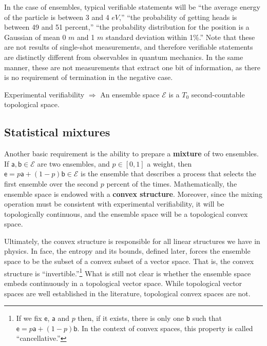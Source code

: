 \documentclass[10pt,twocolumn, nofootinbib]{revtex4-2}
\newcommand{\ens}[1][e] {\mathsf{#1}} %
\newcommand{\Ens}[1][E] {\mathcal{#1}} %
\begin{document}
In the case of ensembles, typical verifiable statements will be ``the average energy of the particle is between 3 and 4 $eV$,'' ``the probability of getting heads is between 49 and 51 percent,'' ``the probability distribution for the position is a Gaussian of mean 0 $m$ and 1 $m$ standard deviation within 1\%.'' Note that these are not results of single-shot measurements, and therefore verifiable statements are distinctly different from observables in quantum mechanics. In the same manner, these are not measurements that extract one bit of information, as there is no requirement of termination in the negative case.

\begin{tcolorbox}[colback=white, colframe=black]
	Experimental verifiability $\Rightarrow$ An ensemble space $\Ens$ is a $T_0$ second-countable topological space.
\end{tcolorbox}


\subsection{Statistical mixtures}
Another basic requirement is the ability to prepare a \textbf{mixture} of two ensembles. If $\ens[a], \ens[b] \in \Ens$ are two ensembles, and $p \in [0,1]$ a weight, then $\ens = p \ens[a] + (1-p) \ens[b] \in \Ens$ is the ensemble that describes a process that selects the first ensemble over the second $p$ percent of the times. Mathematically, the ensemble space is endowed with a \textbf{convex structure}. Moreover, since the mixing operation must be consistent with experimental verifiability, it will be topologically continuous, and the ensemble space will be a topological convex space.

Ultimately, the convex structure is responsible for all linear structures we have in physics. In face, the entropy and its bounds, defined later, forces the ensemble space to be the subset of a convex subset of a vector space. That is, the convex structure is ``invertible.''\footnote{If we fix $\ens$, $\ens[a]$ and $p$ then, if it exists, there is only one $\ens[b]$ such that $\ens = p \ens[a] + (1-p) \ens[b]$. In the context of convex spaces, this property is called ``cancellative.''} What is still not clear is whether the ensemble space embeds continuously in a topological vector space. While topological vector spaces are well established in the literature, topological convex spaces are not. 
\end{document}
